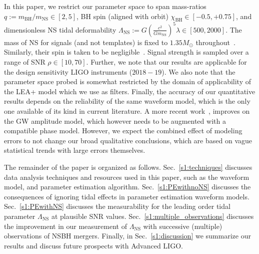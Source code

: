 \documentclass[aps,prd,amsmath,floats,floatfix, twocolumn,
superscriptaddress,nofootinbib,showpacs]{revtex4-1}
\newcommand{\prayush}{\textcolor{red!40!black}}
\newcommand{\lambdans}{\Lambda_\mathrm{NS}}
\newcommand{\chibh}{\chi_\mathrm{BH}}
\newcommand{\mbh}{m_\mathrm{BH}}
\newcommand{\mns}{m_\mathrm{NS}}
\begin{document}
In this paper, we restrict our parameter space to span mass-ratios
$q:=\mbh/\mns\in[2,5]$, BH spin (aligned with orbit)
$\chibh\in[-0.5, +0.75]$, and dimensionless NS tidal deformability 
$\lambdans:= G\left(\frac{c^2}{G \mns}\right)^5\lambda \in[500, 2000]$.
The mass of NS for signals (and not templates) is fixed to $1.35M_\odot$ 
throughout~\cite{stellarcollapsemass}. Similarly, their spin is taken to be
negligible~\cite{Miller:2014aaa}. Signal strength is sampled over a range of
SNR $\rho\in[10, 70]$.
% 
Further, we note that our results are applicable for the design sensitivity
LIGO instruments ($2018-19$).
We also note that the parameter space probed is somewhat restricted by the
domain of applicability of the LEA+ model which we use as filters.
Finally, the accuracy of our quantitative results depends on the reliability of
the same waveform model, which is the only one available of its kind in 
current literature. A more recent work~\cite{Pannarale:2015jka}, improves on
the GW amplitude model, which however needs to be augmented with a compatible
phase model. 
However, we expect the combined effect of modeling errors to not change our 
broad qualitative conclusions, which are based on vague statistical trends 
with large errors themselves.



The remainder of the paper is organized as follows. 
Sec.~\ref{s1:techniques} discusses data analysis techniques and resources 
used in this paper, such as the waveform model, and parameter estimation 
algorithm.
Sec.~\ref{s1:PEwithnoNS} discusses the consequences of ignoring tidal 
effects in parameter estimation waveform models.
Sec.~\ref{s1:PEwithNS} discusses the measurability for the leading order
tidal parameter $\lambdans$ at plausible SNR values.
Sec.~\ref{s1:multiple_observations} discusses the improvement in our
measurement of $\lambdans$ with successive (multiple) observations of
NSBH mergers.
Finally, in Sec.~\ref{s1:discussion} we summarize our results and discuss
future prospects with Advanced LIGO.





\end{document}

